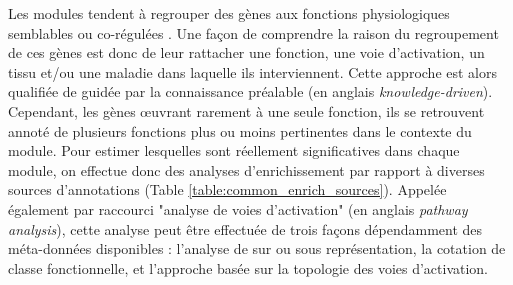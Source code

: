 Les modules tendent à regrouper des gènes aux fonctions physiologiques semblables ou co-régulées \cite{Barabasi2011Jan,Lorenz2011}. Une façon de comprendre la raison du regroupement de ces gènes est donc de leur rattacher une fonction, une voie d'activation, un tissu et/ou une maladie dans laquelle ils interviennent. Cette approche est alors qualifiée de guidée par la connaissance préalable (en anglais \textit{knowledge-driven}). Cependant, les gènes œuvrant rarement à une seule fonction, ils se retrouvent annoté de plusieurs fonctions \cite{Green2006Aug} plus ou moins pertinentes dans le contexte du module. Pour estimer lesquelles sont réellement significatives dans chaque module, on effectue donc des analyses d'enrichissement \cite{Khatri2012} par rapport à diverses sources d'annotations (Table \ref{table:common_enrich_sources}). Appelée également par raccourci "analyse de voies d'activation" (en anglais \textit{pathway analysis}), cette analyse peut être effectuée de trois façons dépendamment des méta-données disponibles : l'analyse de sur ou sous représentation, la cotation de classe fonctionnelle, et l'approche basée sur la topologie des voies d'activation. 


